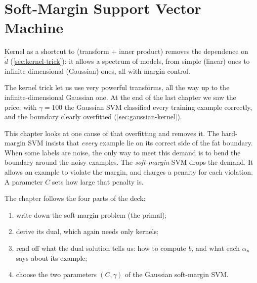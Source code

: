 \chapter{Soft-Margin Support Vector Machine}

\begin{prev}
    Kernel as a shortcut to (transform \(+\) inner product) removes the
    dependence on \(\tilde{d}\) (\autoref{sec:kernel-trick}): it allows a
    spectrum of models, from simple (linear) ones to infinite dimensional
    (Gaussian) ones, all with margin control.
\end{prev}

The kernel trick let us use very powerful transforms, all the way up to the
infinite-dimensional Gaussian one. At the end of the last chapter we saw the
price: with \(\gamma = 100\) the Gaussian SVM classified every training
example correctly, and the boundary clearly overfitted
(\autoref{sec:gaussian-kernel}).

This chapter looks at one cause of that overfitting and removes it. The
hard-margin SVM insists that \emph{every} example lie on its correct side of
the fat boundary. When some labels are noise, the only way to meet this
demand is to bend the boundary around the noisy examples. The
\emph{soft-margin} SVM drops the demand. It allows an example to violate the
margin, and charges a penalty for each violation. A parameter \(C\) sets how
large that penalty is.

The chapter follows the four parts of the deck:
\begin{enumerate}
    \item write down the soft-margin problem (the primal);
    \item derive its dual, which again needs only kernels;
    \item read off what the dual solution tells us: how to compute \(b\),
        and what each \(\alpha_n\) says about its example;
    \item choose the two parameters \((C, \gamma)\) of the Gaussian
        soft-margin SVM.
\end{enumerate}


